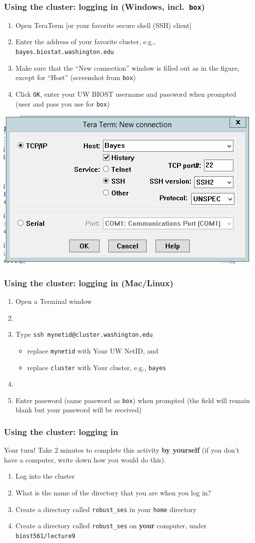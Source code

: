 \documentclass[12pt, 
hyperref={colorlinks=true, linkcolor=BlueViolet, urlcolor=BlueViolet},dvipsnames]{beamer}
\begin{document}
\begin{frame}
\frametitle{Using the cluster: logging in (Windows, incl.~\texttt{box})}
\begin{enumerate}
\item Open TeraTerm [or your favorite secure shell (SSH) client]
\item Enter the address of your favorite cluster, e.g., \texttt{bayes.biostat.washington.edu}
\item Make sure that the ``New connection'' window is filled out as in the figure, except for ``Host'' (screenshot from \texttt{box})
\item Click \texttt{OK}, enter your UW BIOST username and password when prompted (user and pass you use for \texttt{box}) 
\end{enumerate}
\centering
\includegraphics[width = .45\textwidth]{plots/tera_term_example.png}
\end{frame}

\begin{frame}
\frametitle{Using the cluster: logging in (Mac/Linux)}
\begin{enumerate}
\item Open a Terminal window
\item[]
\item Type \texttt{ssh mynetid@cluster.washington.edu}
\begin{itemize}
\item replace \texttt{mynetid} with Your UW NetID, and 
\item replace \texttt{cluster} with Your cluster, e.g., \texttt{bayes}
\end{itemize} 
\item[]
\item Enter password (same password as \texttt{box}) when prompted (the field will remain blank but your password will be received)
\end{enumerate}

\end{frame}

\begin{frame}
\frametitle{Using the cluster: logging in}
Your turn! Take 2 minutes to complete this activity \textbf{by yourself} (if you don't have a computer, write down how you would do this).
\begin{enumerate}
\item Log into the cluster
\item What is the name of the directory that you are when you log in?
\item Create a directory called \texttt{robust\_ses} in your \texttt{home} directory
\item Create a directory called \texttt{robust\_ses} on \textbf{your} computer, under \texttt{biost561/lecture9}
\end{enumerate}
\end{frame}
\end{document}
